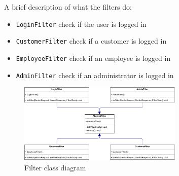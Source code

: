 A brief description of what the filters do:
\begin{itemize}
    \item \texttt{LoginFilter} check if the user is logged in
    \item \texttt{CustomerFilter} check if a customer is logged in
    \item \texttt{EmployeeFilter} check if an employee is logged in
    \item \texttt{AdminFilter} check if an administrator is logged in
\end{itemize}

\begin{figure}[H]
    \centering
    \includegraphics[width=0.7\textwidth]{Schemas/filter.drawio.pdf}
    \caption{Filter class diagram}
    \label{fig:FilterClassDiagram}
\end{figure}